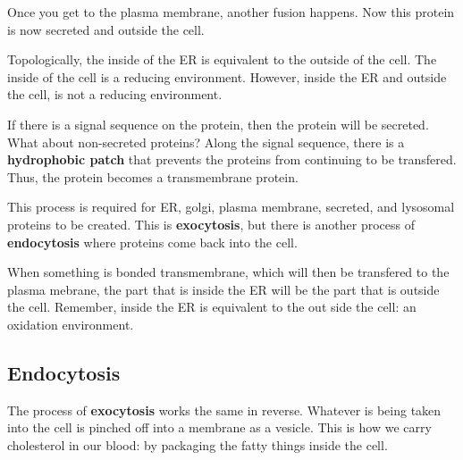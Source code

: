 \documentclass{article}
\begin{document}
Once you get to the plasma membrane, another fusion happens. Now this protein is
now secreted and outside the cell. 

Topologically, the inside of the ER is equivalent to the outside of the cell.
The inside of the cell is a reducing environment. However, inside the ER and
outside the cell, is not a reducing environment. 

If there is a signal sequence on the protein, then the protein will be secreted.
What about non-secreted proteins? Along the signal sequence, there is a
\textbf{hydrophobic patch} that prevents the proteins from continuing to be
transfered. Thus, the protein becomes a transmembrane protein. 

This process is required for ER, golgi, plasma membrane, secreted, and lysosomal
proteins to be created. This is \textbf{exocytosis}, but there is another
process of \textbf{endocytosis} where proteins come back into the cell.

When something is bonded transmembrane, which will then be transfered to the
plasma mebrane, the part that is inside the ER will be the part that is outside
the cell. Remember, inside the ER is equivalent to the out side the cell: an
oxidation environment.

\subsection{Endocytosis}

The process of \textbf{exocytosis} works the same in reverse. Whatever is being
taken into the cell is pinched off into a membrane as a vesicle. This is how we
carry cholesterol in our blood: by packaging the fatty things inside the cell. 
\end{document}
